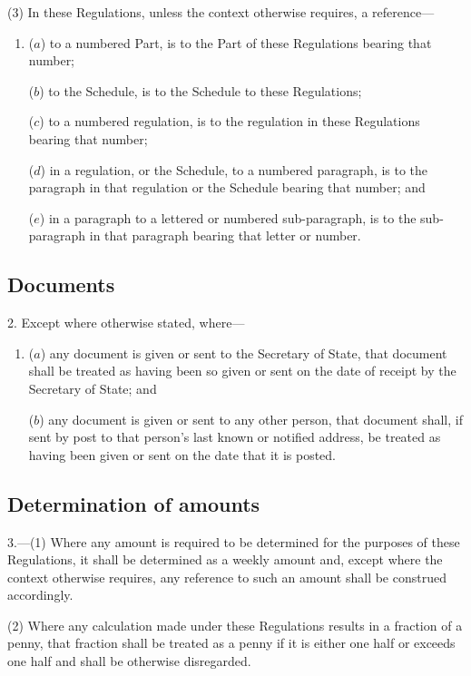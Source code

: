 \documentclass[12pt,a4paper]{article}
\begin{document}
(3) In these Regulations, unless the context otherwise requires, a reference—
\begin{enumerate}\item[]
($a$) to a numbered Part, is to the Part of these Regulations bearing that number;

($b$) to the Schedule, is to the Schedule to these Regulations;

($c$) to a numbered regulation, is to the regulation in these Regulations bearing that number;

($d$) in a regulation, or the Schedule, to a numbered paragraph, is to the paragraph in that regulation or the Schedule bearing that number; and

($e$) in a paragraph to a lettered or numbered sub-paragraph, is to the sub-paragraph in that paragraph bearing that letter or number.
\end{enumerate}

\subsection[2. Documents]{Documents}

2.  Except where otherwise stated, where—
\begin{enumerate}\item[]
($a$) any document is given or sent to the Secretary of State, that document shall be treated as having been so given or sent on the date of receipt by the Secretary of State; and

($b$) any document is given or sent to any other person, that document shall, if sent by post to that person’s last known or notified address, be treated as having been given or sent on the date that it is posted.
\end{enumerate}

\subsection[3. Determination of amounts]{Determination of amounts}

3.---(1)  Where any amount is required to be determined for the purposes of these Regulations, it shall be determined as a weekly amount and, except where the context otherwise requires, any reference to such an amount shall be construed accordingly.

(2) Where any calculation made under these Regulations results in a fraction of a penny, that fraction shall be treated as a penny if it is either one half or exceeds one half and shall be otherwise disregarded.
\end{document}
